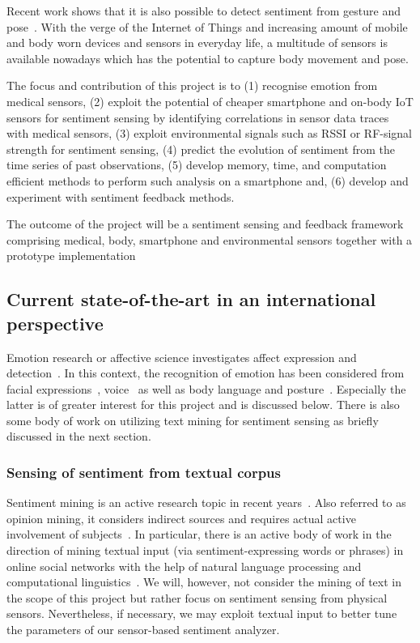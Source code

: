 \documentclass[12pt]{article}
\begin{document}
Recent work shows that it is also possible to detect sentiment from gesture and pose~\cite{Emotion_DeMeijer_1989}. 
With the verge of the Internet of Things and increasing amount of mobile and body worn devices and sensors in everyday life, a multitude of sensors is available nowadays which has the potential to capture body movement and pose. 

The focus and contribution of this project is to (1) recognise emotion from medical sensors, (2) exploit the potential of cheaper smartphone and on-body IoT sensors for sentiment sensing by identifying correlations in sensor data traces with medical sensors, (3) exploit environmental signals such as RSSI or RF-signal strength for sentiment sensing, (4) predict the evolution of sentiment from the time series of past observations, (5) develop memory, time, and computation efficient methods to perform such analysis on a smartphone and, (6) develop and experiment with sentiment feedback methods.

The outcome of the project will be a sentiment sensing and feedback framework comprising medical, body, smartphone and environmental sensors together with a prototype implementation

\subsection*{Current state-of-the-art in an international perspective}
Emotion research or affective science investigates affect expression and detection~\cite{SentimentSensing_Calvo_2010}.
In this context, the recognition of emotion has been considered from facial expressions~\cite{SentimentSensing_Ekman_2003}, voice~\cite{SentimentSensing_Juslin_2005} as well as body language and posture~\cite{SentimentSensing_Mota_2003,SentimentSesing_Mello_2009}.
Especially the latter is of greater interest for this project and is discussed below. 
There is also some body of work on utilizing text mining for sentiment sensing as briefly discussed in the next section. 

\subsubsection*{Sensing of sentiment from textual corpus}
Sentiment mining is an active research topic in recent years~\cite{SentimentSensing_Kramer_2014, SentimentSensing_Cambria_2013}. 
Also referred to as opinion mining, it considers indirect sources and requires actual active involvement of subjects~\cite{SentimentSensing_Pang_2008, SentimentSensing_Zhai_2011}. 
In particular, there is an active body of work in the direction of mining textual input (via sentiment-expressing words or phrases) in online social networks with the help of natural language processing and computational linguistics~\cite{SentimentSensing_Liu_2012}.
We will, however, not consider the mining of text in the scope of this project but rather focus on sentiment sensing from physical sensors. Nevertheless, if necessary, we may exploit textual input to better tune the parameters of our sensor-based sentiment analyzer. 
\end{document}
